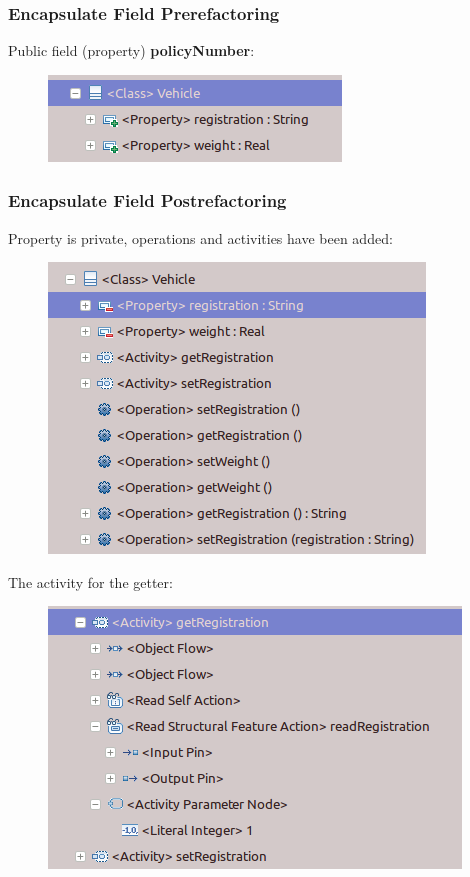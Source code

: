 \documentclass{beamer}
\begin{document}
        
\begin{frame}
\frametitle{Encapsulate Field Prerefactoring}
Public field (property) \textbf{policyNumber}:
\begin{figure}
 \centering
 \includegraphics[scale=0.35]{images/fuml-refactorings/vehicle-prerefactoring.png}
\end{figure}
\end{frame}

\begin{frame}
 \frametitle{Encapsulate Field Postrefactoring}
Property is private, operations and activities have been added:
\begin{figure}
 \centering
 \includegraphics[scale=0.35]{images/fuml-refactorings/vehicle-postrefactoring.png}
\end{figure}
The activity for the getter:
\begin{figure}
 \centering
 \includegraphics[scale=0.35]{images/fuml-refactorings/vehicle-getter-activity.png}
\end{figure}

\end{frame}
\end{document}

